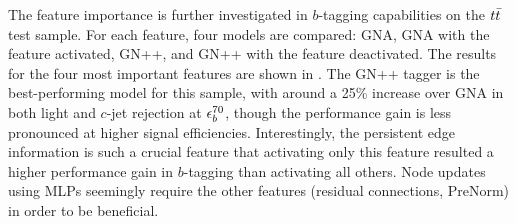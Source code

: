 The feature importance is further investigated in $b$-tagging capabilities on the $t\bar{t}$ test sample.
For each feature, four models are compared: GNA, GNA with the feature activated, GN++, and GN++ with the feature deactivated.
The results for the four most important features are shown in .
The GN++ tagger is the best-performing model for this sample, with around a 25\% increase over GNA in both light and $c$-jet rejection at $\epsilon_b^{70}$, though the performance gain is less pronounced at higher signal efficiencies.
Interestingly, the persistent edge information is such a crucial feature that activating only this feature resulted a higher performance gain in $b$-tagging than activating all others.
Node updates using MLPs seemingly require the other features (residual connections, PreNorm) in order to be beneficial.


